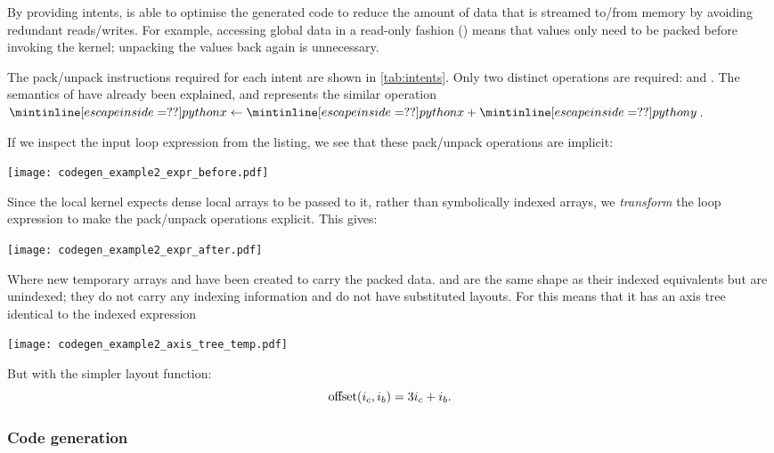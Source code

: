 \documentclass[thesis]{subfiles}
\begin{document}
By providing intents,  is able to optimise the generated code to reduce the amount of data that is streamed to/from memory by avoiding redundant reads/writes.
For example, accessing global data in a read-only fashion () means that values only need to be packed before invoking the kernel; unpacking the values back again is unnecessary.

The pack/unpack instructions required for each intent are shown in \cref{tab:intents}.
Only two distinct operations are required:  and .
The semantics of  have already been explained, and  represents the similar operation $\pycode{x} \gets \pycode{x} + \pycode{y}$.

If we inspect the input loop expression from the listing, we see that these pack/unpack operations are implicit:
\begin{center}
  \texttt{[image: codegen\_example2\_expr\_before.pdf]}
\end{center}
Since the local kernel expects dense local arrays to be passed to it, rather than symbolically indexed arrays, we \emph{transform} the loop expression to make the pack/unpack operations explicit.
This gives:
\begin{center}
  \texttt{[image: codegen\_example2\_expr\_after.pdf]}
\end{center}
Where new temporary arrays  and  have been created to carry the packed data.
 and  are the same shape as their indexed equivalents but are unindexed; they do not carry any indexing information and do not have substituted layouts.
For  this means that it has an axis tree identical to the indexed expression 
\begin{center}
  \texttt{[image: codegen\_example2\_axis\_tree\_temp.pdf]}
\end{center}
But with the simpler layout function:
\begin{equation}
  \textnormal{offset}(i_c, i_b) = 3 i_c + i_b.
  \label{eq:temporary_layout}
\end{equation}

\subsubsection{Code generation}
\end{document}
